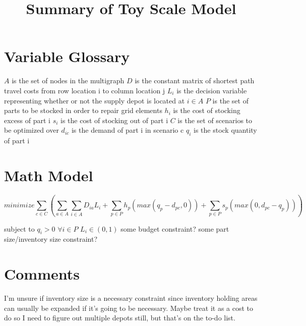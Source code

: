 \documentclass{article}
\begin{document}
\title{Summary of Toy Scale Model}
\maketitle
\section{Variable Glossary}
$A$ is the set of nodes in the multigraph
\newline
$D$ is the constant matrix of shortest path travel costs from row location i to column location j
\newline
$L_i$ is the decision variable representing whether or not the supply depot is located at $i \in A$
\newline
$P$ is the set of parts to be stocked in order to repair grid elements
\newline
$h_i$ is the cost of stocking excess of part i  
\newline
$s_i$ is the cost of stocking out of part i
\newline
$C$ is the set of scenarios to be optimized over
\newline
$d_{ic}$ is the demand of part i in scenario c 
\newline
$q_i$ is the stock quantity of part i
\newline
\section{Math Model}

$$minimize \sum_{c \in C} ( \sum_{a \in A} \sum_{i \in A} D_{ia}L_i + \sum_{p \in P} h_p(max(q_p-d_{pc},0))+\sum_{p \in P} s_p(max(0,d_{pc}-q_p)))$$

subject to
\newline
$ q_i > 0$ \hspace{4pt}  $\forall i \in P$
\newline
$L_i \in (0,1)$
\newline
some budget constraint?
\newline
some part size/inventory size constraint? 

\section{Comments}
I'm unsure if inventory size is a necessary constraint since inventory holding areas can usually be expanded if it's going to be necessary. Maybe treat it as a cost to do so
\newline
I need to figure out multiple depots still, but that's on the to-do list.
\end{document}
